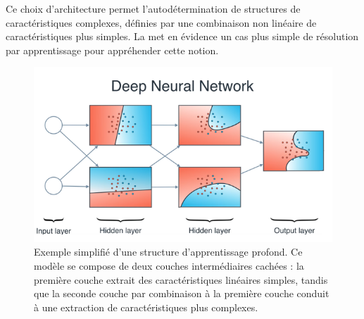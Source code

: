 Ce choix d’architecture permet l’autodétermination de structures de caractéristiques complexes, définies par une combinaison non linéaire de caractéristiques plus simples. La  met en évidence un cas plus simple de résolution par apprentissage pour appréhender cette notion. \par
 
\begin{figure}[H]
    \centering
    \includegraphics[width=\linewidth]{contents/chapter_3/resources/scheme_dnn_understanding.png}
    \caption{Exemple simplifié d'une structure d’apprentissage profond. Ce modèle se compose de deux couches intermédiaires cachées : la première couche extrait des caractéristiques linéaires simples, tandis que la seconde couche par combinaison à la première couche conduit à une extraction de caractéristiques plus complexes.}
    \label{fig:scheme_dnn_understanding}
\end{figure}

